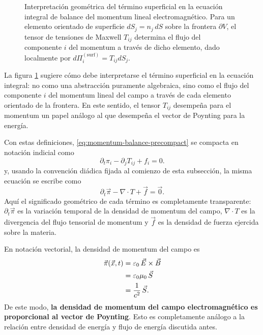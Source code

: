 \documentclass[12pt,a4paper]{article}
\theoremstyle{definition}
\theoremstyle{plain}
\numberwithin{equation}{section}
\theoremstyle{remark}
\newcommand{\E}{\vec{E}}
\newcommand{\B}{\vec{B}}
\begin{document}
\begin{figure}[ht]
    \endgroup
    \caption{Interpretación geométrica del término superficial en la ecuación integral de balance del momentum lineal electromagnético. Para un elemento orientado de superficie \(dS_j=n_j\,dS\) sobre la frontera \(\partial V\), el tensor de tensiones de Maxwell \(T_{ij}\) determina el flujo del componente \(i\) del momentum a través de dicho elemento, dado localmente por \(d\Pi_i^{(\mathrm{surf})}=T_{ij}dS_j\).}
    \label{fig:maxwell-stress-surface-flux}
\end{figure}
La figura \ref{fig:maxwell-stress-surface-flux} sugiere cómo debe interpretarse el término superficial en la ecuación integral: no como una abstracción puramente algebraica, sino como el flujo del componente \(i\) del momentum lineal del campo a través de cada elemento orientado de la frontera. En este sentido, el tensor \(T_{ij}\) desempeña para el momentum un papel análogo al que desempeña el vector de Poynting para la energía.

Con estas definiciones, \eqref{eq:momentum-balance-precompact} se compacta en notación indicial como
\begin{equation}
    \partial_t\pi_i-\partial_jT_{ij}+f_i=0.
    \label{eq:momentum-local-balance}
\end{equation}
y, usando la convención diádica fijada al comienzo de esta subsección, la misma ecuación se escribe como
\begin{equation}
    \partial_t\vec\pi-\nabla\cdot T+\vec f=\vec 0.
    \label{eq:momentum-local-balance-diadic}
\end{equation}
Aquí el significado geométrico de cada término es completamente transparente: $\partial_t\vec\pi$ es la variación temporal de la densidad de momentum del campo, $\nabla\cdot T$ es la divergencia del flujo tensorial de momentum y $\vec f$ es la densidad de fuerza ejercida sobre la materia.

En notación vectorial, la densidad de momentum del campo es
\begin{align}
    \vec\pi(\vec x,t)
    &=\varepsilon_0\,\E\times\B \notag\\
    &=\varepsilon_0\mu_0\,\vec S \notag\\
    &=\frac{1}{c^2}\,\vec S.
    \label{eq:momentum-density-vector}
\end{align}
De este modo, \textbf{la densidad de momentum del campo electromagnético es proporcional al vector de Poynting}. Esto es completamente análogo a la relación entre densidad de energía y flujo de energía discutida antes.
\end{document}
